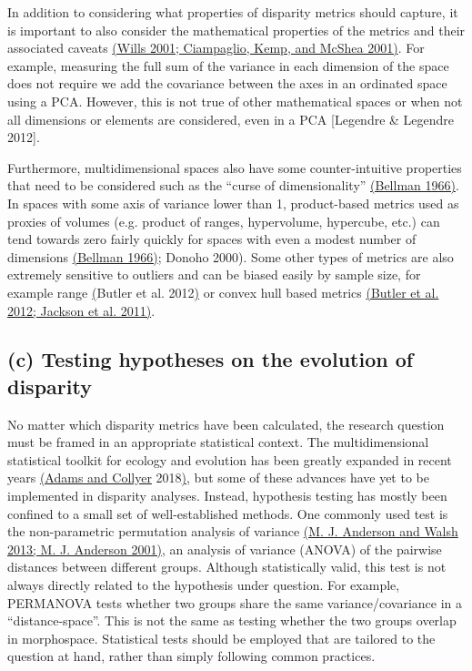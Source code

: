 In addition to considering what properties of disparity metrics should
capture, it is important to also consider the mathematical properties of
the metrics and their associated caveats
\href{https://paperpile.com/c/sTGYvp/nFf7+ROH8}{(Wills 2001; Ciampaglio,
Kemp, and McShea 2001)}. For example, measuring the full sum of the
variance in each dimension of the space does not require we add the
covariance between the axes in an ordinated space using a PCA. However,
this is not true of other mathematical spaces or when not all dimensions
or elements are considered, even in a PCA {[}Legendre \& Legendre
2012{]}.

Furthermore, multidimensional spaces also have some counter-intuitive
properties that need to be considered such as the ``curse of
dimensionality'' \href{https://paperpile.com/c/sTGYvp/Qsl3}{(Bellman
1966)}. In spaces with some axis of variance lower than 1, product-based
metrics used as proxies of volumes (e.g. product of ranges, hypervolume,
hypercube, etc.) can tend towards zero fairly quickly for spaces with
even a modest number of dimensions
\href{https://paperpile.com/c/sTGYvp/Qsl3}{(Bellman 1966)}; Donoho
2000). Some other types of metrics are also extremely sensitive to
outliers and can be biased easily by sample size, for example range
\href{https://paperpile.com/c/sTGYvp/aSSL}{(}Butler et al.
2012\href{https://paperpile.com/c/sTGYvp/aSSL}{)} or convex hull based
metrics \href{https://paperpile.com/c/sTGYvp/aSSL+PwyQ}{(Butler et al.
2012; Jackson et al. 2011)}.

\hypertarget{c-testing-hypotheses-on-the-evolution-of-disparity}{%
\subsection{(c) Testing hypotheses on the evolution of
disparity}\label{c-testing-hypotheses-on-the-evolution-of-disparity}}

No matter which disparity metrics have been calculated, the research
question must be framed in an appropriate statistical context. The
multidimensional statistical toolkit for ecology and evolution has been
greatly expanded in recent years
\href{https://paperpile.com/c/sTGYvp/ZnDd}{(Adams and Collyer}
2018\href{https://paperpile.com/c/sTGYvp/ZnDd}{)}, but some of these
advances have yet to be implemented in disparity analyses. Instead,
hypothesis testing has mostly been confined to a small set of
well-established methods. One commonly used test is the non-parametric
permutation analysis of variance
\href{https://paperpile.com/c/sTGYvp/3hy2+SC6L}{(M. J. Anderson and
Walsh 2013; M. J. Anderson 2001)}, an analysis of variance (ANOVA) of
the pairwise distances between different groups. Although statistically
valid, this test is not always directly related to the hypothesis under
question. For example, PERMANOVA tests whether two groups share the same
variance/covariance in a ``distance-space''. This is not the same as
testing whether the two groups overlap in morphospace. Statistical tests
should be employed that are tailored to the question at hand, rather
than simply following common practices.

